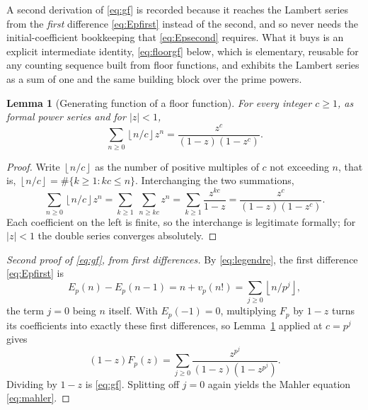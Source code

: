\documentclass[11pt,a4paper]{article}
\numberwithin{equation}{section}
\newtheorem{lemma}[theorem]{Lemma}
\theoremstyle{definition}
\theoremstyle{remark}
\newcommand{\floor}[1]{\left\lfloor#1\right\rfloor}
\begin{document}
A second derivation of \eqref{eq:gf} is recorded because it reaches the Lambert series from the \emph{first} difference \eqref{eq:Epfirst} instead of the second, and so never needs the initial-coefficient bookkeeping that \eqref{eq:Epsecond} requires. What it buys is an explicit intermediate identity, \eqref{eq:floorgf} below, which is elementary, reusable for any counting sequence built from floor functions, and exhibits the Lambert series as a sum of one and the same building block over the prime powers.

\begin{lemma}[Generating function of a floor function]\label{lem:floorgf}
For every integer $c\geq1$, as formal power series and for $|z|<1$,
\begin{equation}\label{eq:floorgf}
 \sum_{n\geq0}\floor{n/c}z^n=\frac{z^c}{(1-z)(1-z^c)}.
\end{equation}
\end{lemma}
\begin{proof}
Write $\floor{n/c}$ as the number of positive multiples of $c$ not exceeding $n$, that is, $\floor{n/c}=\#\{k\geq1:kc\leq n\}$. Interchanging the two summations,
\[
 \sum_{n\geq0}\floor{n/c}z^n
 =\sum_{k\geq1}\ \sum_{n\geq kc}z^n
 =\sum_{k\geq1}\frac{z^{kc}}{1-z}
 =\frac{z^c}{(1-z)(1-z^c)} .
\]
Each coefficient on the left is finite, so the interchange is legitimate formally; for $|z|<1$ the double series converges absolutely.
\end{proof}

\begin{proof}[Second proof of \eqref{eq:gf}, from first differences]
By \eqref{eq:legendre}, the first difference \eqref{eq:Epfirst} is
\[
 E_p(n)-E_p(n-1)=n+v_p(n!)=\sum_{j\geq0}\floor{n/p^j},
\]
the term $j=0$ being $n$ itself. With $E_p(-1)=0$, multiplying $F_p$ by $1-z$ turns its coefficients into exactly these first differences, so Lemma~\ref{lem:floorgf} applied at $c=p^j$ gives
\[
 (1-z)F_p(z)=\sum_{j\geq0}\frac{z^{p^j}}{(1-z)(1-z^{p^j})} .
\]
Dividing by $1-z$ is \eqref{eq:gf}. Splitting off $j=0$ again yields the Mahler equation \eqref{eq:mahler}.
\end{proof}
\end{document}
